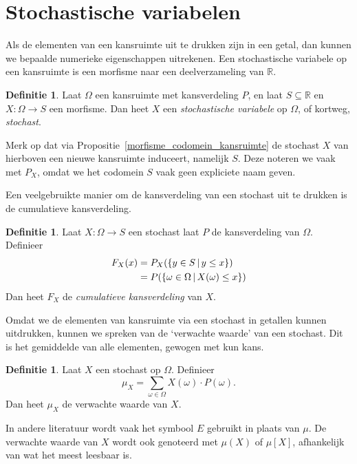 \documentclass[a4paper]{book}
\theoremstyle{definition}
\newtheorem{definition}[theorem]{Definitie}
\newcommand{\reals}{\mathbb{R}}
\begin{document}
\section{Stochastische variabelen}

Als de elementen van een kansruimte uit te drukken zijn in een getal, dan kunnen we bepaalde numerieke eigenschappen uitrekenen.
Een stochastische variabele op een kansruimte is een morfisme naar een deelverzameling van $\reals$.

\begin{definition}
    Laat $\Omega$ een kansruimte met kansverdeling $P$, en laat $S \subseteq \reals$ en $X : \Omega \to S$ een morfisme.
    Dan heet $X$ een \emph{stochastische variabele} op $\Omega$, of kortweg, \emph{stochast}.
\end{definition}

Merk op dat via Propositie~\ref{morfisme_codomein_kansruimte} de stochast $X$ van hierboven een nieuwe kansruimte induceert, namelijk $S$. Deze
noteren we vaak met $P_X$, omdat we het codomein $S$ vaak geen expliciete naam geven.

Een veelgebruikte manier om de kansverdeling van een stochast uit te drukken is de cumulatieve kansverdeling.
\begin{definition}
    Laat $X : \Omega \to S$ een stochast laat $P$ de kansverdeling van $\Omega$.
    Definieer
    \begin{align*}
        F_X(x) &= P_X(\set{y \in S}{y \leq x}) \\
               &= P(\set{\omega \in \Omega}{X(\omega) \leq x}) \\
    \end{align*}
    Dan heet $F_X$ de \emph{cumulatieve kansverdeling} van $X$.
\end{definition}


Omdat we de elementen van kansruimte via een stochast in getallen kunnen uitdrukken, kunnen we spreken van de `verwachte waarde' van een stochast.
Dit is het gemiddelde van alle elementen, gewogen met kun kans.

\begin{definition}
    Laat $X$ een stochast op $\Omega$.
    Definieer \[ \mu_X = \sum_{\omega \in \Omega} X(\omega) \cdot P(\omega). \]
    Dan heet $\mu_X$ de verwachte waarde van $X$.
\end{definition}

In andere literatuur wordt vaak het symbool $E$ gebruikt in plaats van $\mu$.
De verwachte waarde van $X$ wordt ook genoteerd met $\mu(X)$ of $\mu[X]$, afhankelijk van wat het meest leesbaar is.
\end{document}
